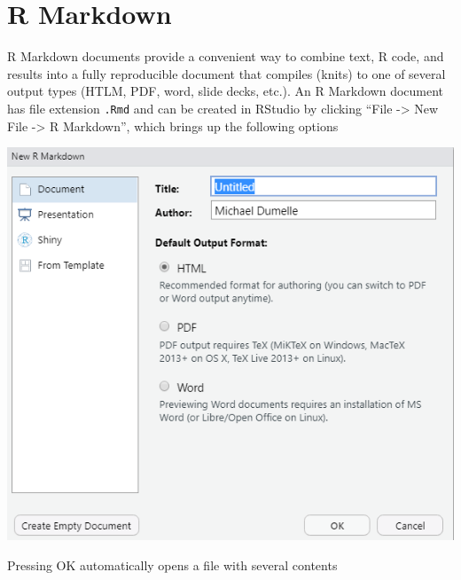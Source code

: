 \documentclass[
]{book}
\begin{document}
\hypertarget{rmarkdown}{%
\section{R Markdown}\label{rmarkdown}}

R Markdown documents provide a convenient way to combine text, R code, and results into a fully reproducible document that compiles (knits) to one of several output types (HTLM, PDF, word, slide decks, etc.). An R Markdown document has file extension \texttt{.Rmd} and can be created in RStudio by clicking ``File -\textgreater{} New File -\textgreater{} R Markdown'', which brings up the following options

\includegraphics[width=1\linewidth]{images/rmark1}

Pressing OK automatically opens a file with several contents
\end{document}
